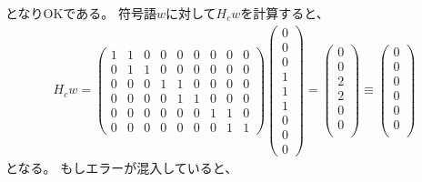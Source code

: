 \documentclass[]{ltjsarticle}
\begin{document}
となりOKである。
符号語$w$に対して$H_c w$を計算すると、
\begin{align}
    H_c w 
    =    
    \begin{pmatrix}
        1 & 1 & 0 & 0 & 0 & 0 & 0 & 0 & 0 \\
        0 & 1 & 1 & 0 & 0 & 0 & 0 & 0 & 0 \\
        0 & 0 & 0 & 1 & 1 & 0 & 0 & 0 & 0 \\
        0 & 0 & 0 & 0 & 1 & 1 & 0 & 0 & 0 \\
        0 & 0 & 0 & 0 & 0 & 0 & 1 & 1 & 0 \\
        0 & 0 & 0 & 0 & 0 & 0 & 0 & 1 & 1
    \end{pmatrix}    
    \begin{pmatrix}
        0 \\ 0 \\ 0 \\ 
        1 \\ 1 \\ 1 \\ 
        0 \\ 0 \\ 0
    \end{pmatrix}
    =
    \begin{pmatrix}
        0 \\ 0 \\
        2 \\ 2 \\
        0 \\ 0 \\
    \end{pmatrix}
    \equiv
    \begin{pmatrix}
        0 \\ 0 \\
        0 \\ 0 \\
        0 \\ 0 \\
    \end{pmatrix}
\end{align}
となる。
もしエラーが混入していると、
\end{document}
